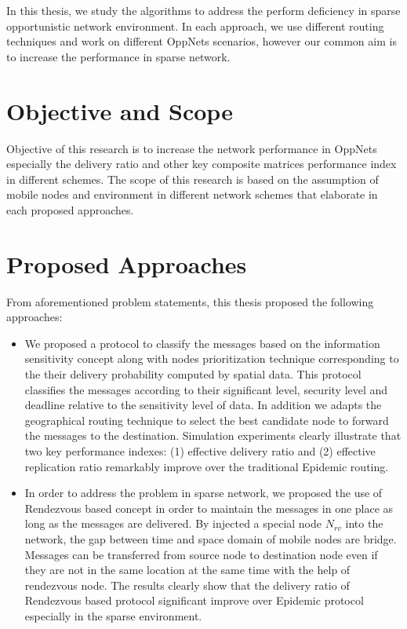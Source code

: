 In this thesis, we study the algorithms to address the perform deficiency in sparse opportunistic network environment.
In each approach, we use different routing techniques and work on different OppNets scenarios, however our common aim is to increase the performance in sparse network.
\section{Objective and Scope}
\label{intro:Objective and Scope}
Objective of this research is to increase the network performance in OppNets especially the delivery ratio and other key composite matrices performance index in different schemes.
The scope of this research is based on the assumption of mobile nodes and environment in different network schemes that elaborate in each proposed approaches.

\section{Proposed Approaches}
\label{intro:Proposed Approaches}
From aforementioned problem statements, this thesis proposed the following approaches:
\begin{itemize}
  \item %
  We proposed a protocol to classify the messages based on the information sensitivity concept along with nodes prioritization technique corresponding to the their delivery probability computed by spatial data. 
  This protocol classifies the messages according to their significant level, security level and deadline relative to the sensitivity level of data. 
  In addition we adapts the geographical routing technique to select the best candidate node to forward the messages to the destination. 
  Simulation experiments clearly illustrate that two key performance indexes: (1) effective delivery ratio and (2) effective replication ratio remarkably improve over the traditional Epidemic routing. 
  
  
  \item %
In order to address the problem in sparse network, we proposed the use of Rendezvous based concept in order to maintain the messages in one place as long as the messages are delivered. 
By injected a special node $N_{rv}$ into the network, the gap between time and space domain of mobile nodes are bridge. Messages can be transferred from source node to destination node even if they are not in the same location at the same time with the help of rendezvous node. 
The results clearly show that the delivery ratio of Rendezvous based protocol significant improve over Epidemic protocol especially in the sparse environment.
\end{itemize}

